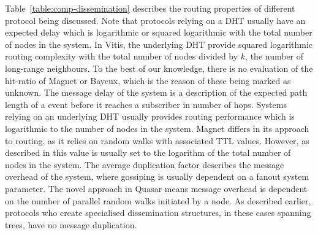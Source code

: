 Table~\ref{table:comp-dissemination} describes the routing properties of
different protocol being discussed. Note that protocols relying on a DHT
usually have an expected delay which is logarithmic or squared
logarithmic with the total number of nodes in the system. In Vitis, the
underlying DHT provide squared logarithmic routing complexity with the
total number of nodes divided by $k$, the number of long-range
neighbours. To the best of our knowledge, there is no evaluation of the
hit-ratio of Magnet or Bayeux, which is the reason of these being marked
as unknown. The message delay of the system is a description of the
expected path length of a event before it reaches a subscriber in number
of hops. Systems relying on an underlying DHT usually provides routing
performance which is logarithmic to the number of nodes in the system.
Magnet differs in its approach to routing, as it relies on random walks
with associated TTL values. However, as described in
\cite{Girdzijauskas:2010} this value is usually set to the logarithm of the
total number of nodes in the system. The average duplication factor
describes the message overhead of the system, where gossiping is usually
dependent on a fanout system parameter. The novel approach in Quasar
means message overhead is dependent on the number of parallel random
walks initiated by a node. As described earlier, protocols who create
specialised dissemination structures, in these cases spanning trees,
have no message duplication.
